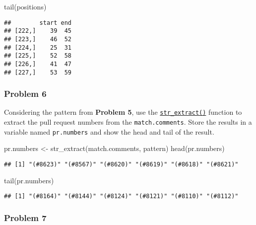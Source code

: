\documentclass[
]{article}
\newenvironment{Shaded}{\begin{snugshade}}{\end{snugshade}}
\newcommand{\FunctionTok}[1]{\textcolor[rgb]{0.00,0.00,0.00}{#1}}
\newcommand{\NormalTok}[1]{#1}
\newcommand{\OtherTok}[1]{\textcolor[rgb]{0.56,0.35,0.01}{#1}}
\begin{document}
\begin{Shaded}
\begin{Highlighting}[]
\FunctionTok{tail}\NormalTok{(positions)}
\end{Highlighting}
\end{Shaded}

\begin{verbatim}
##        start end
## [222,]    39  45
## [223,]    46  52
## [224,]    25  31
## [225,]    52  58
## [226,]    41  47
## [227,]    53  59
\end{verbatim}

\hypertarget{problem-6}{%
\subsubsection{Problem 6}\label{problem-6}}

Considering the pattern from \textbf{Problem 5}, use the
\href{https://stringr.tidyverse.org/reference/str_extract.html}{\texttt{str\_extract()}}
function to extract the pull request numbers from the
\texttt{match.comments}. Store the results in a variable named
\texttt{pr.numbers} and show the head and tail of the result.

\begin{Shaded}
\begin{Highlighting}[]
\NormalTok{pr.numbers }\OtherTok{\textless{}{-}} \FunctionTok{str\_extract}\NormalTok{(match.comments, pattern)}
\FunctionTok{head}\NormalTok{(pr.numbers)}
\end{Highlighting}
\end{Shaded}

\begin{verbatim}
## [1] "(#8623)" "(#8567)" "(#8620)" "(#8619)" "(#8618)" "(#8621)"
\end{verbatim}

\begin{Shaded}
\begin{Highlighting}[]
\FunctionTok{tail}\NormalTok{(pr.numbers)}
\end{Highlighting}
\end{Shaded}

\begin{verbatim}
## [1] "(#8164)" "(#8144)" "(#8124)" "(#8121)" "(#8110)" "(#8112)"
\end{verbatim}

\hypertarget{problem-7}{%
\subsubsection{Problem 7}\label{problem-7}}
\end{document}

